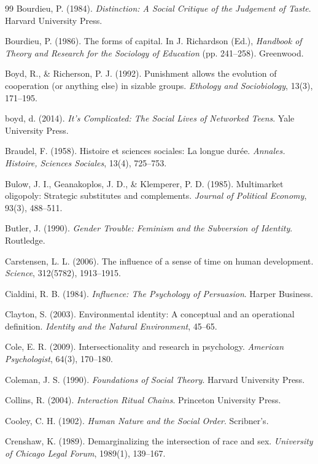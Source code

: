 \begin{thebibliography}{99}
Bourdieu, P. (1984).
\textit{Distinction: A Social Critique of the Judgement of Taste}.
Harvard University Press.

Bourdieu, P. (1986).
The forms of capital.
In J. Richardson (Ed.), \textit{Handbook of Theory and Research for the Sociology of Education} (pp. 241--258).
Greenwood.

Boyd, R., \& Richerson, P. J. (1992).
Punishment allows the evolution of cooperation (or anything else) in sizable groups.
\textit{Ethology and Sociobiology}, 13(3), 171--195.

boyd, d. (2014).
\textit{It's Complicated: The Social Lives of Networked Teens}.
Yale University Press.

Braudel, F. (1958).
Histoire et sciences sociales: La longue durée.
\textit{Annales. Histoire, Sciences Sociales}, 13(4), 725--753.

Bulow, J. I., Geanakoplos, J. D., \& Klemperer, P. D. (1985).
Multimarket oligopoly: Strategic substitutes and complements.
\textit{Journal of Political Economy}, 93(3), 488--511.

Butler, J. (1990).
\textit{Gender Trouble: Feminism and the Subversion of Identity}.
Routledge.

Carstensen, L. L. (2006).
The influence of a sense of time on human development.
\textit{Science}, 312(5782), 1913--1915.

Cialdini, R. B. (1984).
\textit{Influence: The Psychology of Persuasion}.
Harper Business.

Clayton, S. (2003).
Environmental identity: A conceptual and an operational definition.
\textit{Identity and the Natural Environment}, 45--65.

Cole, E. R. (2009).
Intersectionality and research in psychology.
\textit{American Psychologist}, 64(3), 170--180.

Coleman, J. S. (1990).
\textit{Foundations of Social Theory}.
Harvard University Press.

Collins, R. (2004).
\textit{Interaction Ritual Chains}.
Princeton University Press.

Cooley, C. H. (1902).
\textit{Human Nature and the Social Order}.
Scribner's.

Crenshaw, K. (1989).
Demarginalizing the intersection of race and sex.
\textit{University of Chicago Legal Forum}, 1989(1), 139--167.


\end{thebibliography}
